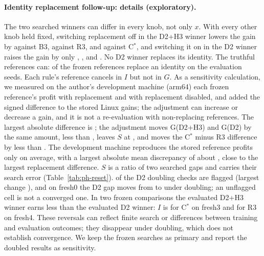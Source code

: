 \documentclass[11pt]{article}
\begin{document}
\paragraph{Identity replacement follow-up: details (exploratory).} The two searched winners can differ in every knob, not only $x$. With every other knob held fixed, switching replacement off in the D2+H3 winner lowers the gain by  against B3,  against R3, and  against C$^*$, and switching it on in the D2 winner raises the gain by only , , and . No D2 winner replaces its identity. The truthful references can:  of the  frozen references replace an identity on the evaluation seeds. Each rule's reference cancels in $I$ but not in $G$. As a sensitivity calculation, we measured on the author's development machine (arm64) each frozen reference's profit with replacement and with replacement disabled, and added the signed difference to the stored Linux gains; the adjustment can increase or decrease a gain, and it is not a re-evaluation with non-replacing references. The largest absolute difference is ; the adjustment moves G(D2+H3) and G(D2) by the same amount, less than , leaves $S$ at , and moves the C$^*$ minus R3 difference by less than . The development machine reproduces the stored reference profits only on average, with a largest absolute mean discrepancy of about , close to the largest replacement difference. $S$ is a ratio of two searched gaps and carries their search error (Table~\ref{tab:ph-reset}).  of the  D2 doubling checks are flagged (largest change ), and on fresh0 the D2 gap moves from  to  under doubling; an unflagged cell is not a converged one. In two frozen comparisons the evaluated D2+H3 winner earns less than the evaluated D2 winner: $I$ is  for C$^*$ on fresh3 and  for R3 on fresh4. These reversals can reflect finite search or differences between training and evaluation outcomes; they disappear under doubling, which does not establish convergence. We keep the frozen searches as primary and report the doubled results as sensitivity.

\begin{table}[t]\centering\small
{}
\caption{Exploratory follow-up, after the report, without churn: the development runner-up comparator C-thr() against R3 on the six fresh markets, per attack family and search version, with the market-level $t$ interval ( degrees of freedom) over the six market differences, the number of markets on which R3 has the lower or higher gain, and C$^*$ minus runner-up.}\label{tab:ph-runnerup}
\end{table}
\end{document}
